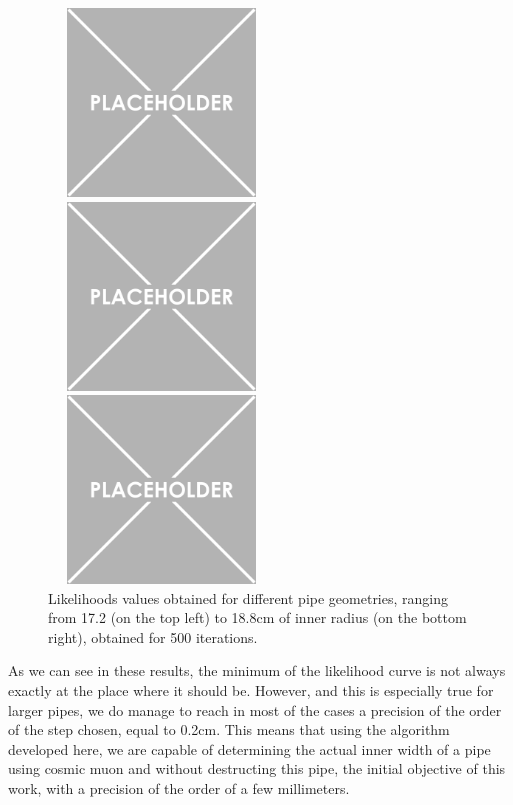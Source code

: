 \documentclass[a4paper, 11pt]{report}
\begin{document}
\begin{figure}[htbp]
\begin{minipage}[b]{.32\textwidth}
\includegraphics[width=6cm, height=5cm]{figs/placeholder.png}
\end{minipage}\hfill
\begin{minipage}[b]{.32\textwidth}
\includegraphics[width=6cm, height=5cm]{figs/placeholder.png}
\end{minipage} \hfill
\begin{minipage}[b]{.32\textwidth}
\includegraphics[width=6cm, height=5cm]{figs/placeholder.png}
\end{minipage} \hfill
\caption{Likelihoods values obtained for different pipe geometries, ranging from 17.2 (on the top left) to 18.8cm of inner radius (on the bottom right), obtained for 500 iterations.}
\label{fig:likelihoods2}
\end{figure}

As we can see in these results, the minimum of the likelihood curve is not always exactly at the place where it should be. However, and this is especially true for larger pipes, we do manage to reach in most of the cases a precision of the order of the step chosen, equal to 0.2cm. This means that using the algorithm developed here, we are capable of determining the actual inner width of a pipe using cosmic muon and without destructing this pipe, the initial objective of this work, with a precision of the order of a few millimeters.
\end{document}
